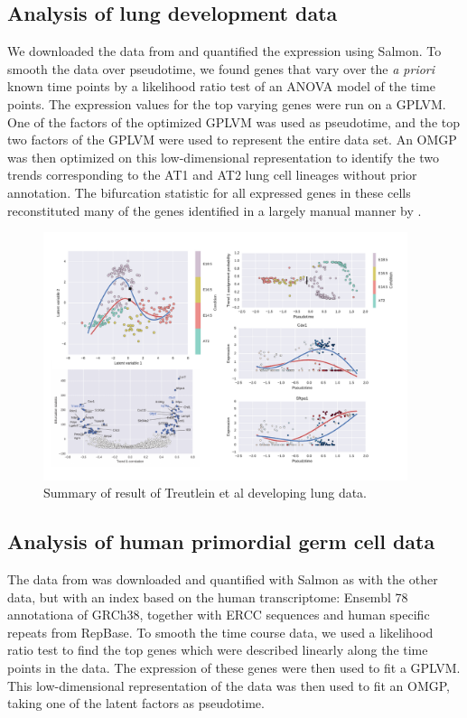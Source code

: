 \subsection{Analysis of lung development data}

We downloaded the data from \cite{Treutlein2014-rz} and quantified the expression using Salmon. To smooth the data over pseudotime, we found genes that vary over the \textit{a priori} known time points by a likelihood ratio test of an ANOVA model of the time points. The expression values for the top varying genes were run on a GPLVM. One of the factors of the optimized GPLVM was used as pseudotime, and the top two factors of the GPLVM were used to represent the entire data set. An OMGP was then optimized on this low-dimensional representation to identify the two trends corresponding to the AT1 and AT2 lung cell lineages without prior annotation. The bifurcation statistic for all expressed genes in these cells reconstituted many of the genes identified in a largely manual manner by \cite{Treutlein2014-rz}.

\begin{figure}
    \centering
    \includegraphics[width=0.95\textwidth]{"fig-treutlein"}
    \caption{Summary of  result of Treutlein et al developing lung data.}
    \label{fig:treutlein}
\end{figure}

\subsection{Analysis of human primordial germ cell data}

The data from \cite{Guo2015-ao} was downloaded and quantified with Salmon as with the other data, but with an index based on the human transcriptome: Ensembl 78 annotationa of GRCh38, together with ERCC sequences and human specific repeats from RepBase. To smooth the time course data, we used a likelihood ratio test to find the top genes which were described linearly along the time points in the data. The expression of these genes were then used to fit a GPLVM. This low-dimensional representation of the data was then used to fit an OMGP, taking one of the latent factors as pseudotime.


